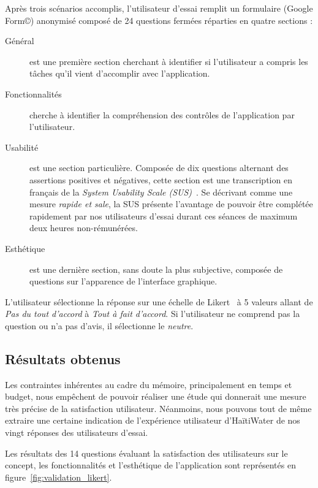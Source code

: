 \documentclass{EPL-master-thesis-covers-FR}
\begin{document}
				Après trois scénarios accomplis, l'utilisateur d'essai remplit un formulaire (Google Form\copyright) anonymisé composé de 24 questions fermées réparties en quatre sections :
				\begin{description}
					\item[Général] est une première section cherchant à identifier si l'utilisateur a compris les tâches qu'il vient d'accomplir avec l'application.
					\item[Fonctionnalités] cherche à identifier la compréhension des contrôles de l'application par l'utilisateur.
					\item[Usabilité] est une section particulière. Composée de dix questions alternant des assertions positives et négatives, cette section est une transcription en français de la \emph{System Usability Scale (SUS)}~\cite{ref:sus}. Se décrivant comme une mesure \emph{rapide et sale}, la SUS présente l'avantage de pouvoir être complétée rapidement par nos utilisateurs d'essai durant ces séances de maximum deux heures non-rémunérées.
					\item[Esthétique] est une dernière section, sans doute la plus subjective, composée de questions sur l'apparence de l'interface graphique.
				\end{description}

				L'utilisateur sélectionne la réponse sur une échelle de Likert~\cite{ref:wikipedia_likert_scale} à 5 valeurs allant de \emph{Pas du tout d'accord} à \emph{Tout à fait d'accord}. Si l'utilisateur ne comprend pas la question ou n'a pas d'avis, il sélectionne le \emph{neutre}.

			\subsection*{Résultats obtenus}

				Les contraintes inhérentes au cadre du mémoire, principalement en temps et budget, nous empêchent de pouvoir réaliser une étude qui donnerait une mesure très précise de la satisfaction utilisateur. Néanmoins, nous pouvons tout de même extraire une certaine indication de l'expérience utilisateur d'HaïtiWater de nos vingt réponses des utilisateurs d'essai.

				Les résultats des 14 questions évaluant la satisfaction des utilisateurs sur le concept, les fonctionnalités et l'esthétique de l'application sont représentés en figure~\ref{fig:validation_likert}.
\end{document}
